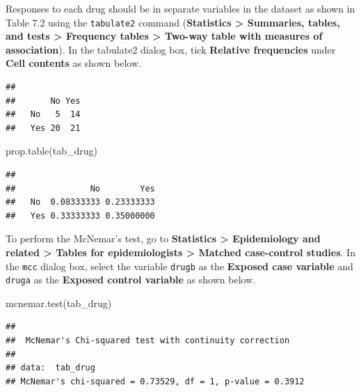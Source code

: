 \documentclass[
]{memoir}
\newenvironment{Shaded}{\begin{snugshade}}{\end{snugshade}}
\newcommand{\FunctionTok}[1]{\textcolor[rgb]{0.00,0.00,0.00}{#1}}
\newcommand{\NormalTok}[1]{#1}
\newcommand{\OtherTok}[1]{\textcolor[rgb]{0.56,0.35,0.01}{#1}}
\newcommand{\SpecialCharTok}[1]{\textcolor[rgb]{0.00,0.00,0.00}{#1}}
\begin{document}
Responses to each drug should be in separate variables in the dataset as shown in Table 7.2 using the \texttt{tabulate2} command (\textbf{Statistics \textgreater{} Summaries, tables, and tests \textgreater{} Frequency tables \textgreater{} Two-way table with measures of association}). In the tabulate2 dialog box, tick \textbf{Relative frequencies} under \textbf{Cell contents} as shown below.

\begin{Shaded}
\end{Shaded}

\begin{verbatim}
##      
##       No Yes
##   No   5  14
##   Yes 20  21
\end{verbatim}

\begin{Shaded}
\begin{Highlighting}[]
\FunctionTok{prop.table}\NormalTok{(tab\_drug)}
\end{Highlighting}
\end{Shaded}

\begin{verbatim}
##      
##               No        Yes
##   No  0.08333333 0.23333333
##   Yes 0.33333333 0.35000000
\end{verbatim}

To perform the McNemar's test, go to \textbf{Statistics \textgreater{} Epidemiology and related \textgreater{} Tables for epidemiologists \textgreater{} Matched case-control studies}. In the \texttt{mcc} dialog box, select the variable \texttt{drugb} as the \textbf{Exposed case variable} and \texttt{druga} as the \textbf{Exposed control variable} as shown below.

\begin{Shaded}
\begin{Highlighting}[]
\FunctionTok{mcnemar.test}\NormalTok{(tab\_drug)}
\end{Highlighting}
\end{Shaded}

\begin{verbatim}
## 
##  McNemar's Chi-squared test with continuity correction
## 
## data:  tab_drug
## McNemar's chi-squared = 0.73529, df = 1, p-value = 0.3912
\end{verbatim}
\end{document}
